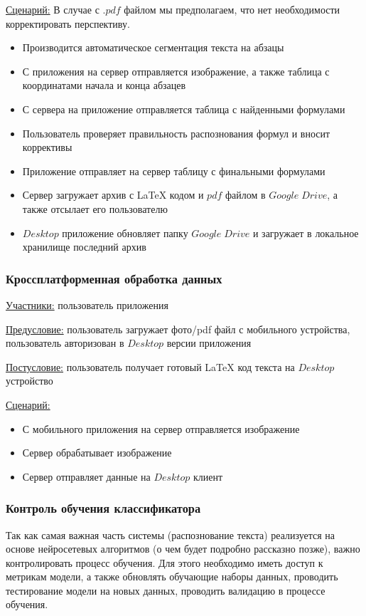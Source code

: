 \underline{Сценарий:}
В случае с $.pdf$ файлом мы предполагаем, что нет необходимости корректировать перспективу.
\begin{itemize}
    \item Производится автоматическое сегментация текста на абзацы
    \item С приложения на сервер отправляется изображение, а также таблица с координатами начала и конца абзацев
    \item С сервера на приложение отправляется таблица с найденными формулами
    \item Пользователь проверяет правильность распознования формул и вносит коррективы
    \item Приложение отправляет на сервер таблицу с финальными формулами
    \item Сервер загружает архив с \LaTeX\; кодом и $pdf$ файлом в $Google\;Drive$, а также отсылает его пользователю
    \item $Desktop$ приложение обновляет папку $Google\;Drive$ и загружает в локальное хранилище последний архив
\end{itemize}

\subsubsection{Кроссплатформенная обработка данных}
\underline{Участники:} пользователь приложения

\underline{Предусловие:} пользователь загружает фото/pdf файл с мобильного устройства, пользователь авторизован в $Desktop$ версии приложения

\underline{Постусловие:} пользователь получает готовый \LaTeX\; код текста на $Desktop$ устройство

\underline{Сценарий:}
\begin{itemize}
    \item С мобильного приложения на сервер отправляется изображение
    \item Сервер обрабатывает изображение
    \item Сервер отправляет данные на $Desktop$ клиент
\end{itemize}

\subsubsection{Контроль обучения классификатора}

Так как самая важная часть системы (распознование текста) реализуется на основе нейросетевых алгоритмов (о чем будет подробно рассказно позже), важно контролировать процесс обучения.
Для этого необходимо иметь доступ к метрикам модели, а также обновлять обучающие наборы данных, проводить тестирование модели на новых данных, проводить валидацию в процессе обучения.

